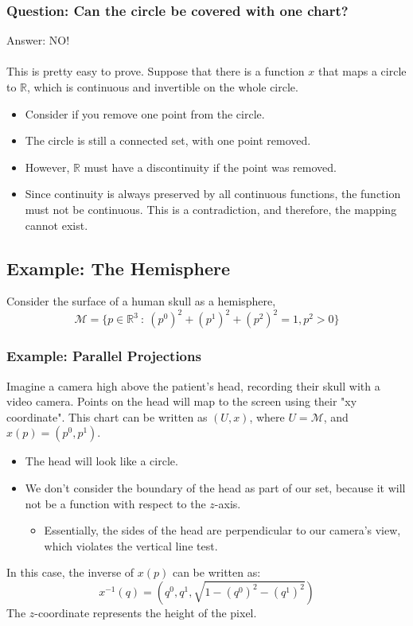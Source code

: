 \documentclass[10pt]{article}
\begin{document}
\subsubsection*{Question: Can the circle be covered with one chart?}
Answer: NO!\\\\
This is pretty easy to prove.  Suppose that there is a function $x$ that maps a circle to $\mathbb{R}$, which is continuous and invertible on the whole circle.
\begin{itemize}
    \item Consider if you remove one point from the circle.  
    \item The circle is still a connected set, with one point removed.
    \item However, $\mathbb{R}$ must have a discontinuity if the point was removed.
    \item Since continuity is always preserved by all continuous functions, the function must not be continuous.  This is a contradiction, and therefore, the mapping cannot exist.
\end{itemize}

\subsection*{Example: The Hemisphere}
Consider the surface of a human skull as a hemisphere,
\[\mathcal{M} = \{p \in \mathbb{R}^3 \::\: (p^0)^2 + (p^1)^2 + (p^2)^2 = 1, p^2 > 0\}\]
\subsubsection*{Example: Parallel Projections}
Imagine a camera high above the patient's head, recording their skull with a video camera.  Points on the head will map to the screen using their "xy coordinate".  This chart can be written as $(U, x)$, where $U = \mathcal{M}$, and $x(p) = (p^0, p^1)$.
\begin{itemize}
    \item The head will look like a circle.  
    \item We don't consider the boundary of the head as part of our set, because it will not be a function with respect to the $z$-axis.
    \begin{itemize}
        \item Essentially, the sides of the head are perpendicular to our camera's view, which violates the vertical line test.
    \end{itemize}
\end{itemize}
In this case, the inverse of $x(p)$ can be written as:
\[x^{-1}(q) = (q^0, q^1, \sqrt{1 - (q^0)^2 - (q^1)^2})\]
The $z$-coordinate represents the height of the pixel.
\end{document}
